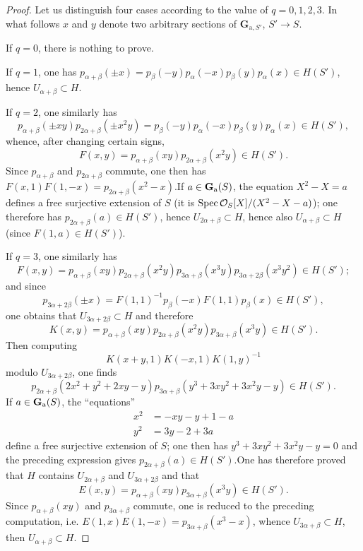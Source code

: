 \begin{proof}
Let us distinguish four cases according to the value of $q=0,1,2,3$. In what follows $x$ and $y$ denote two arbitrary sections of $\mathbf G_{\mathrm a,S'}$, $S'\to S$.

If $q=0$, there is nothing to prove.

If $q=1$, one has $p_{\alpha+\beta}(\pm x)=p_\beta(-y)p_\alpha(-x)p_\beta(y)p_\alpha(x)\in H(S')$, hence $U_{\alpha+\beta}\subset H$.

If $q=2$, one similarly has
\[
p_{\alpha+\beta}(\pm xy)p_{2\alpha+\beta}(\pm x^2y)=p_\beta(-y)p_\alpha(-x)p_\beta(y)p_\alpha(x)\in H(S'),
\]
whence, after changing certain signs,
\[
F(x,y)=p_{\alpha+\beta}(xy)p_{2\alpha+\beta}(x^2y)\in H(S').
\]
Since $p_{\alpha+\beta}$ and $p_{2\alpha+\beta}$ commute, one then has $F(x,1)F(1,-x)=p_{2\alpha+\beta}(x^2-x)$.If $a\in\mathbf{G}_{\mathrm{a}}(S)$, the equation $X^2-X=a$ defines a free surjective extension of $S$ (it is $\operatorname{Spec}\mathcal{O}_S[X]/(X^2-X-a)$); one therefore has $p_{2\alpha+\beta}(a)\in H(S')$, hence $U_{2\alpha+\beta}\subset H$, hence also $U_{\alpha+\beta}\subset H$ (since $F(1,a)\in H(S')$).

If $q=3$, one similarly has
\[
F(x,y)=p_{\alpha+\beta}(xy)p_{2\alpha+\beta}(x^2y)p_{3\alpha+\beta}(x^3y)p_{3\alpha+2\beta}(x^3y^2)\in H(S');
\]
and since
\[
p_{3\alpha+2\beta}(\pm x)=F(1,1)^{-1}p_\beta(-x)F(1,1)p_\beta(x)\in H(S'),
\]
one obtains that $U_{3\alpha+2\beta}\subset H$ and therefore
\[
K(x,y)=p_{\alpha+\beta}(xy)p_{2\alpha+\beta}(x^2y)p_{3\alpha+\beta}(x^3y)\in H(S').
\]
Then computing
\[
K(x+y,1)K(-x,1)K(1,y)^{-1}
\]
modulo $U_{3\alpha+2\beta}$, one finds
\[
p_{2\alpha+\beta}(2x^2+y^2+2xy-y)p_{3\alpha+\beta}(y^3+3xy^2+3x^2y-y)\in H(S').
\]
If $a\in\mathbf{G}_{\mathrm{a}}(S)$, the ``equations''
\[
\begin{aligned}
x^2&=-xy-y+1-a\\
y^2&=3y-2+3a
\end{aligned}
\]
define a free surjective extension of $S$; one then has $y^3+3xy^2+3x^2y-y=0$ and the preceding expression gives $p_{2\alpha+\beta}(a)\in H(S')$.One has therefore proved that $H$ contains $U_{2\alpha+\beta}$ and $U_{3\alpha+2\beta}$ and that
\[
E(x,y)=p_{\alpha+\beta}(xy)p_{3\alpha+\beta}(x^3y)\in H(S').
\]
Since $p_{\alpha+\beta}(xy)$ and $p_{3\alpha+\beta}$ commute, one is reduced to the preceding computation, i.e. $E(1,x)E(1,-x)=p_{3\alpha+\beta}(x^3-x)$, whence $U_{3\alpha+\beta}\subset H$, then $U_{\alpha+\beta}\subset H$.
\end{proof}
